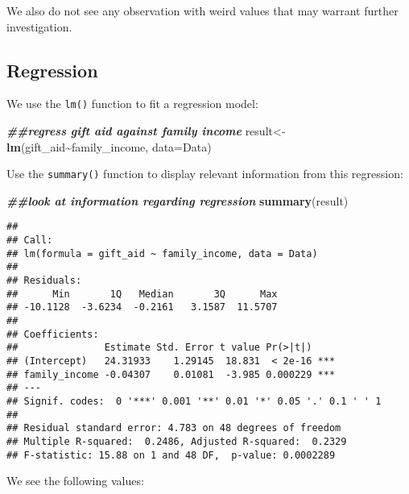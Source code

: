 \documentclass[
]{book}
\newenvironment{Shaded}{\begin{snugshade}}{\end{snugshade}}
\newcommand{\AttributeTok}[1]{\textcolor[rgb]{0.13,0.29,0.53}{#1}}
\newcommand{\DocumentationTok}[1]{\textcolor[rgb]{0.56,0.35,0.01}{\textbf{\textit{#1}}}}
\newcommand{\FunctionTok}[1]{\textcolor[rgb]{0.13,0.29,0.53}{\textbf{#1}}}
\newcommand{\NormalTok}[1]{#1}
\newcommand{\OtherTok}[1]{\textcolor[rgb]{0.56,0.35,0.01}{#1}}
\newcommand{\SpecialCharTok}[1]{\textcolor[rgb]{0.81,0.36,0.00}{\textbf{#1}}}
\begin{document}
We also do not see any observation with weird values that may warrant further investigation.

\hypertarget{regression}{%
\subsection*{Regression}\label{regression}}

We use the \texttt{lm()} function to fit a regression model:

\begin{Shaded}
\begin{Highlighting}[]
\DocumentationTok{\#\#regress gift aid against family income}
\NormalTok{result}\OtherTok{\textless{}{-}}\FunctionTok{lm}\NormalTok{(gift\_aid}\SpecialCharTok{\textasciitilde{}}\NormalTok{family\_income, }\AttributeTok{data=}\NormalTok{Data)}
\end{Highlighting}
\end{Shaded}

Use the \texttt{summary()} function to display relevant information from this regression:

\begin{Shaded}
\begin{Highlighting}[]
\DocumentationTok{\#\#look at information regarding regression}
\FunctionTok{summary}\NormalTok{(result)}
\end{Highlighting}
\end{Shaded}

\begin{verbatim}
## 
## Call:
## lm(formula = gift_aid ~ family_income, data = Data)
## 
## Residuals:
##      Min       1Q   Median       3Q      Max 
## -10.1128  -3.6234  -0.2161   3.1587  11.5707 
## 
## Coefficients:
##               Estimate Std. Error t value Pr(>|t|)    
## (Intercept)   24.31933    1.29145  18.831  < 2e-16 ***
## family_income -0.04307    0.01081  -3.985 0.000229 ***
## ---
## Signif. codes:  0 '***' 0.001 '**' 0.01 '*' 0.05 '.' 0.1 ' ' 1
## 
## Residual standard error: 4.783 on 48 degrees of freedom
## Multiple R-squared:  0.2486, Adjusted R-squared:  0.2329 
## F-statistic: 15.88 on 1 and 48 DF,  p-value: 0.0002289
\end{verbatim}

We see the following values:
\end{document}

